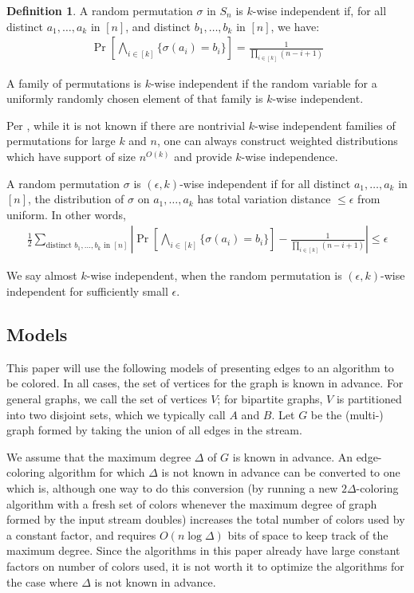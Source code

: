 \documentclass[10pt]{article}
\theoremstyle{definition}\newtheorem{definition}[lemma]{Definition}
\theoremstyle{remark}  \newtheorem*{remark}{Remark}
\begin{document}
\begin{definition} 
  A random permutation $\sigma$ in $S_n$ is $k$-wise independent if, for all
  distinct $a_1,\ldots,a_k$ in $[n]$, and distinct $b_1,\ldots,b_k$ in $[n]$,
  we have:
  \begin{align*}
    \Pr\left[\bigwedge_{i \in [k]} \{ \sigma(a_i) = b_i \} \right] = \frac{1}{\prod_{i \in [k]} (n - i + 1)}
  \end{align*}
  
  A family of permutations is $k$-wise independent if the random variable for 
  a uniformly randomly chosen element of that family is $k$-wise independent.
  
  Per \cite{AlonL12}, while it is not known if there are nontrivial
  $k$-wise independent families of permutations for large $k$ and $n$, one can
  always construct weighted distributions which have support of size $n^{O(k)}$ and provide
  $k$-wise independence.

  A random permutation $\sigma$ is $(\epsilon,k)$-wise independent if for all distinct $a_1,\ldots,a_k$ in $[n]$, the distribution of $\sigma$ on $a_1,\ldots,a_k$ has total variation distance $\le \epsilon$ from uniform. In other words,
  \begin{align*}
      \frac{1}{2} \sum_{\text{distinct $b_1,\ldots,b_k$ in $[n]$}} \left| \Pr\left[\bigwedge_{i \in [k]} \{ \sigma(a_i) = b_i \} \right] - \frac{1}{\prod_{i \in [k]} (n - i + 1)} \right| \le \epsilon
  \end{align*}

  We say almost $k$-wise independent, when the random permutation is $(\epsilon,k)$-wise independent for sufficiently small $\epsilon$.
\end{definition}

\subsection{Models}

This paper will use the following models of presenting edges to an algorithm to be colored. In all cases, the set of vertices for the graph is known in advance. For general graphs, we call the set of vertices $V$; for bipartite graphs, $V$ is partitioned into two disjoint sets, which we typically call $A$ and $B$. Let $G$ be the (multi-) graph formed by taking the union of all edges in the stream.

We assume that the maximum degree $\Delta$ of $G$ is known in advance. An edge-coloring algorithm for which $\Delta$ is not known in advance can be converted to one which is, although one way to do this conversion (by running a new $2 \Delta$-coloring algorithm with a fresh set of colors whenever the maximum degree of graph formed by the input stream doubles) increases the total number of colors used by a constant factor, and requires  $O(n \log \Delta)$ bits of space to keep track of the maximum degree.
Since the algorithms in this paper already have large constant factors on number of colors used, it is not worth it to optimize the algorithms for the case where $\Delta$ is not known in advance.
\end{document}

